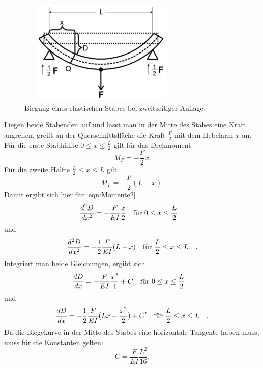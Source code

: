 \begin{figure}
    \centering
\includegraphics[width= 8cm, height= 5cm]{./plots/abb2.png}
\caption{Biegung eines elastischen Stabes bei zweitseitiger Auflage.\cite{V103}}
\label{fig:abb2}
\end{figure}
\noindent Liegen beide Stabenden auf und lässt man in der Mitte des Stabes
eine Kraft angreifen, greift an der Querschnittsfläche die Kraft
$\frac{F}{2}$ mit dem Hebelarm $x$ an. Für die erste Stabhälfte $0 \leq x \leq \frac{L}{2}$
gilt für das Drehmoment
\begin{equation*}
M_{F} = - \frac{F}{2} x.
\end{equation*}
Für die zweite Hälfte $\frac{L}{2} \leq x \leq L$ gilt
\begin{equation*}
M_{F} = - \frac{F}{2} (L-x).
\end{equation*}
Damit ergibt sich hier für \eqref{eqn:Momente2}
\begin{equation}
\frac{d^2D}{dx^2} = - \frac{F}{EI} \frac{x}{2} \qq{für $0 \leq x \leq \frac{L}{2}$}
\label{eqn:links}
\end{equation}
und
\begin{equation}
\frac{d^2D}{dx^2} = -\frac{1}{2} \frac{F}{EI} (L-x) \qq{für $\frac{L}{2} \leq x \leq L$}.
\label{eqn:rechts}
\end{equation}
Integriert man beide Gleichungen, ergibt sich 
\begin{equation*}
\frac{dD}{dx} = - \frac{F}{EI} \frac{x^2}{4} + C \qq{für $0 \leq x \leq \frac{L}{2}$}
\end{equation*}
und
\begin{equation*}
\frac{dD}{dx} = - \frac{1}{2} \frac{F}{EI} (Lx-\frac{x^2}{2}) + C' \qq{für $\frac{L}{2} \leq x \leq L$}.
\end{equation*}
Da die Biegekurve in der Mitte des Stabes eine horizontale Tangente
haben muss, muss für die Konstanten gelten:
\begin{equation*}
C = \frac{F}{EI} \frac{L^2}{16}.
\end{equation*}
